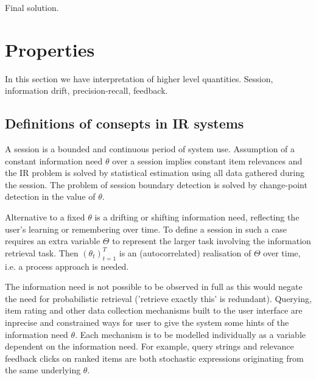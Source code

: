 \documentclass[10pt]{tufte-handout}
\begin{document}
\begin{marginfigure}%
\noindent{}
\caption{Final solution.}
\label{fig:graph5}
\end{marginfigure}


\section{Properties}

In this section we have interpretation of higher level quantities. Session, information drift, precision-recall, feedback.

\subsection{Definitions of consepts in IR systems}
A session is a bounded and continuous period of system use. Assumption of a constant information need $\theta$ over a session implies constant item relevances and the IR problem is solved by statistical estimation using all data gathered during the session. The problem of session boundary detection is solved by change-point detection in the value of $\theta$. 

Alternative to a fixed $\theta$ is a drifting or shifting information need, reflecting the user's learning or remembering over time. To define a session in such a case requires an extra variable $\Theta$ to represent the larger task involving the information retrieval task. Then $(\theta_t)_{t=1}^T$ is an (autocorrelated) realisation of $\Theta$ over time, i.e. a process approach is needed.

The information need is not possible to be observed in full as this would negate the need for probabilistic retrieval ('retrieve exactly this' is redundant). Querying, item rating and other data collection mechanisms built to the user interface are inprecise and constrained ways for user to give the system some hints of the information need $\theta$. Each mechanism is to be modelled individually as a variable dependent on the information need. For example, query strings and relevance feedback clicks on ranked items are both stochastic expressions originating from the same underlying $\theta$.
\end{document}
